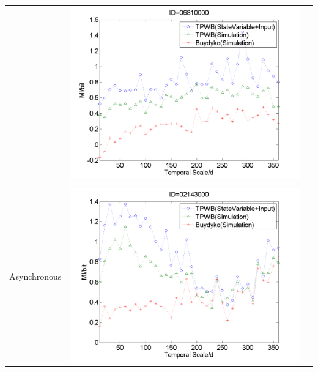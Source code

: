 \documentclass[review]{elsarticle}
\begin{document}
\begin{table}[H]
{\begin{tabular}{ccc}
&\begin{minipage}{.6\textwidth}\includegraphics[width=\linewidth]{resultgraph/06810000MI.png}\end{minipage}
\\
\\
Asynchronous
&\begin{minipage}{.6\textwidth}\includegraphics[width=\linewidth]{resultgraph/02143000MI.png}\end{minipage}
 

\end{tabular}}
\end{table}
\end{document}
